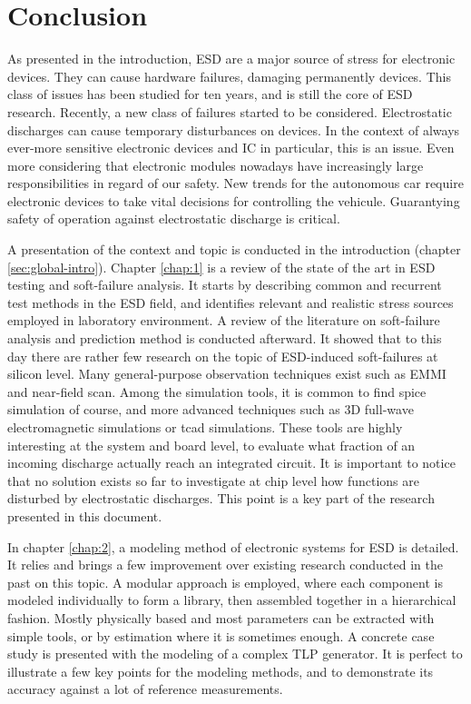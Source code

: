 \chapter{Conclusion}
\label{sec:final-conclusion}

As presented in the introduction, ESD are a major source of stress for electronic devices.
They can cause hardware failures, damaging permanently devices.
This class of issues has been studied for ten years, and is still the core of ESD research.
Recently, a new class of failures started to be considered.
Electrostatic discharges can cause temporary disturbances on devices.
In the context of always ever-more sensitive electronic devices and IC in particular, this is an issue.
Even more considering that electronic modules nowadays have increasingly large responsibilities in regard of our safety.
New trends for the autonomous car require electronic devices to take vital decisions for controlling the vehicule.
Guarantying safety of operation against electrostatic discharge is critical.

A presentation of the context and topic is conducted in the introduction (chapter \ref{sec:global-intro}).
Chapter \ref{chap:1} is a review of the state of the art in ESD testing and soft-failure analysis.
It starts by describing common and recurrent test methods in the ESD field, and identifies relevant and realistic stress sources employed in laboratory environment.
A review of the literature on soft-failure analysis and prediction method is conducted afterward.
It showed that to this day there are rather few research on the topic of ESD-induced soft-failures at silicon level.
Many general-purpose observation techniques exist such as EMMI and near-field scan.
Among the simulation tools, it is common to find \gls{spice} simulation of course, and more advanced techniques such as 3D full-wave electromagnetic simulations or \gls{tcad} simulations.
These tools are highly interesting at the system and board level, to evaluate what fraction of an incoming discharge actually reach an integrated circuit.
It is important to notice that no solution exists so far to investigate at chip level how functions are disturbed by electrostatic discharges.
This point is a key part of the research presented in this document.

In chapter \ref{chap:2}, a modeling method of electronic systems for ESD is detailed.
It relies and brings a few improvement over existing research conducted in the past on this topic.
A modular approach is employed, where each component is modeled individually to form a library, then assembled together in a hierarchical fashion.
Mostly physically based and most parameters can be extracted with simple tools, or by estimation where it is sometimes enough.
A concrete case study is presented with the modeling of a complex TLP generator.
It is perfect to illustrate a few key points for the modeling methods, and to demonstrate its accuracy against a lot of reference measurements.

